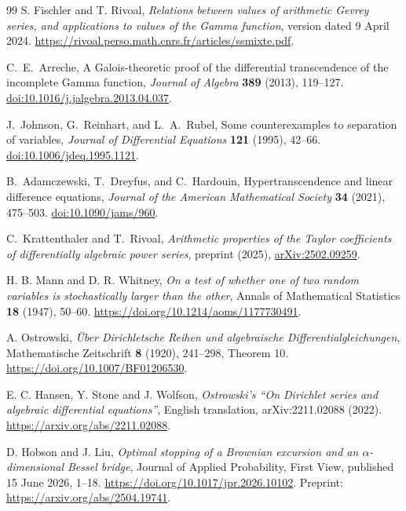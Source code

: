 \documentclass[11pt,a4paper]{article}
\theoremstyle{definition}
\theoremstyle{remark}
\numberwithin{equation}{section}
\begin{document}
\begin{thebibliography}{99}
S. Fischler and T. Rivoal, \emph{Relations between values of arithmetic
Gevrey series, and applications to values of the Gamma function},
version dated 9 April 2024.
\url{https://rivoal.perso.math.cnrs.fr/articles/ssmixte.pdf}.

C.~E.~Arreche,
A Galois-theoretic proof of the differential transcendence of the
incomplete Gamma function,
\emph{Journal of Algebra} \textbf{389} (2013), 119--127.
\href{https://doi.org/10.1016/j.jalgebra.2013.04.037}{doi:10.1016/j.jalgebra.2013.04.037}.

J.~Johnson, G.~Reinhart, and L.~A.~Rubel,
Some counterexamples to separation of variables,
\emph{Journal of Differential Equations} \textbf{121} (1995), 42--66.
\href{https://doi.org/10.1006/jdeq.1995.1121}{doi:10.1006/jdeq.1995.1121}.

B.~Adamczewski, T.~Dreyfus, and C.~Hardouin,
Hypertranscendence and linear difference equations,
\emph{Journal of the American Mathematical Society} \textbf{34}
(2021), 475--503.
\href{https://doi.org/10.1090/jams/960}{doi:10.1090/jams/960}.

C.~Krattenthaler and T.~Rivoal,
\emph{Arithmetic properties of the Taylor coefficients of
differentially algebraic power series}, preprint (2025),
\href{https://arxiv.org/abs/2502.09259}{arXiv:2502.09259}.

H. B. Mann and D. R. Whitney,
\emph{On a test of whether one of two random variables is
stochastically larger than the other},
Annals of Mathematical Statistics \textbf{18} (1947), 50--60.
\url{https://doi.org/10.1214/aoms/1177730491}.

A. Ostrowski,
\emph{\"Uber Dirichletsche Reihen und algebraische Differentialgleichungen},
Mathematische Zeitschrift \textbf{8} (1920), 241--298, Theorem 10.
\url{https://doi.org/10.1007/BF01206530}.

E. C. Hansen, Y. Stone and J. Wolfson,
\emph{Ostrowski's ``On Dirichlet series and algebraic differential
equations''}, English translation, arXiv:2211.02088 (2022).
\url{https://arxiv.org/abs/2211.02088}.

D. Hobson and J. Liu,
\emph{Optimal stopping of a Brownian excursion and an
$\alpha$-dimensional Bessel bridge}, Journal of Applied Probability,
First View, published 15 June 2026, 1--18.
\url{https://doi.org/10.1017/jpr.2026.10102}.
Preprint: \url{https://arxiv.org/abs/2504.19741}.


\end{thebibliography}
\end{document}
